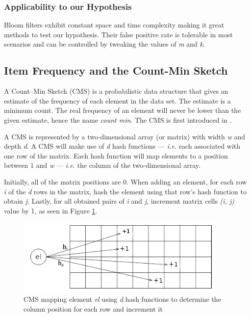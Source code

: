 \subsubsection*{Applicability to our Hypothesis}
Bloom filters exhibit constant space and time complexity making it great methods to test our hypothesis. Their false positive rate is tolerable in most scenarios and can be controlled by tweaking the values of \textit{m} and \textit{k}.


\subsection{Item Frequency and the Count-Min Sketch}

A Count–Min Sketch (CMS) is a probabilistic data structure that gives an estimate of the frequency of each element in the data set. The estimate is a minimum count. The real frequency of an element will never be lower than the given estimate, hence the name \textit{count min}. The CMS is first introduced in \cite{Cormode-CMS}. 

A CMS is represented by a two-dimensional array (or matrix) with width \textit{w} and depth \textit{d}. A CMS will make use of \textit{d} hash functions --- \textit{i.e.} each associated with one row of the matrix. Each hash function will map elements to a position between 1 and \textit{w} --- \textit{i.e.} the column of the two-dimensional array.

Initially, all of the matrix positions are 0. When adding an element, for each row \textit{i} of the \textit{d} rows in the matrix, hash the element using that row's hash function to obtain \textit{j}. Lastly, for all obtained pairs of \textit{i} and \textit{j}, increment matrix cells \textit{(i, j)} value by 1, as seen in Figure \ref{fig:cms}.

\begin{figure}[!htb]
    \begin{center}
      \includegraphics[scale=0.8]{figures/cms.png}
      \caption[Count-Min Sketch update]{CMS mapping element \textit{el} using \textit{d} hash functions to determine the column position for each row and increment it}
      \label{fig:cms}
    \end{center}
\end{figure}

